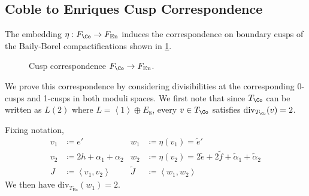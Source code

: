 \documentclass{amsart}
\renewcommand{\tilde}{\widetilde}
\begin{document}
\subsection{Coble to Enriques Cusp Correspondence}\label{coble-to-enriques-cusp-correspondence}

\begin{theorem}

The embedding \(\eta: F_{\Co}\to F_{\operatorname{En}}\) induces the correspondence on boundary cusps of the Baily-Borel compactifications shown in \cref{fig:enriques-coble-correspondence}.

\begin{figure}[H]
\centering

\caption{Cusp correspondence $F_{\Co} \to F_{\operatorname{En}}$.}
\label{fig:enriques-coble-correspondence}
\end{figure}

\end{theorem}

\begin{remark}

We prove this correspondence by considering divisibilities at the corresponding 0-cusps and 1-cusps in both moduli spaces. We first note that since \(T_{\Co}\) can be written as \(L(2)\) where \(L = \left\langle{1}\right\rangle \oplus E_8\), every \(v\in T_{\Co}\) satisfies \(\operatorname{div}_{T_{\Co}}(v) = 2\).

\end{remark}

\begin{lemma}

\label{lem:divisibility_Tco_one} Fixing notation, \begin{align*}     v_1 &\coloneqq e' & w_1 &\coloneqq\eta(v_1) = \tilde e' \\     v_2 &\coloneqq 2h + \alpha_1 + \alpha_2 & w_2 &\coloneqq\eta(v_2) = 2\tilde e + 2\tilde f + \tilde\alpha_1 + \tilde\alpha_2 \\     J &\coloneqq\left\langle{v_1, v_2}\right\rangle & \tilde J &\coloneqq\left\langle{w_1, w_2}\right\rangle \end{align*} We then have \(\mathrm{div}_{T_{\operatorname{En}} }(w_1) = 2\).

\end{lemma}
\end{document}
